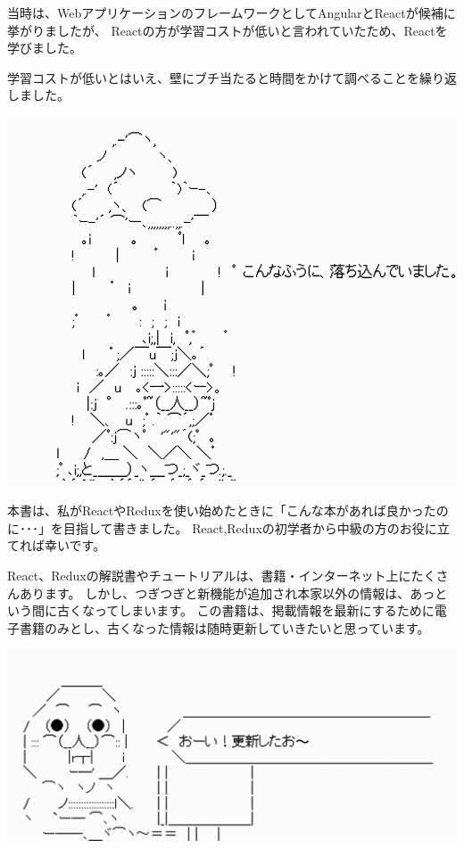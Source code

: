 \vspace*{\baselineskip}

当時は、WebアプリケーションのフレームワークとしてAngularとReactが候補に挙がりましたが、
Reactの方が学習コストが低いと言われていたため、Reactを学びました。

学習コストが低いとはいえ、壁にブチ当たると時間をかけて調べることを繰り返しました。

\begin{reviewimage}[H]%
\includegraphics[width=0.7\maxwidth]{./images/00-preface/greetings02.png}%
\label{image:00-preface:greetings02}
\end{reviewimage}
\vspace*{\baselineskip}

本書は、私がReactやReduxを使い始めたときに「こんな本があれば良かったのに･･･」を目指して書きました。
React,Reduxの初学者から中級の方のお役に立てれば幸いです。

\vspace*{\baselineskip}

React、Reduxの解説書やチュートリアルは、書籍・インターネット上にたくさんあります。
しかし、つぎつぎと新機能が追加され本家以外の情報は、あっという間に古くなってしまいます。
この書籍は、掲載情報を最新にするために電子書籍のみとし、古くなった情報は随時更新していきたいと思っています。

\begin{reviewimage}[H]%
\includegraphics[width=0.7\maxwidth]{./images/00-preface/greetings03.png}%
\label{image:00-preface:greetings03}
\end{reviewimage}

